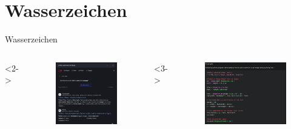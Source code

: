 \documentclass[a4paper,
	DIV=13,
	14pt,
	BCOR=10mm,
	department=FakEI,
	twoside,
	parskip=half,
	automark,
	aspectratio=169
]{beamer}
\begin{document}
\section{Wasserzeichen}
\begin{frame}{Wasserzeichen}
	\begin{columns}
		<2->
		\begin{figure}[H]
			\includegraphics[height=0.8\textheight]{img/first-search.png}
		\end{figure}

		<3->
		\begin{figure}[H]
			\includegraphics[width=\linewidth]{img/website1.png}
		\end{figure}
	\end{columns}
\end{frame}
\end{document}
